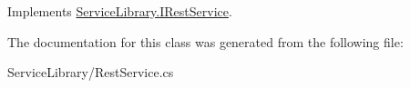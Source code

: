 Implements \hyperlink{interface_service_library_1_1_i_rest_service_a8d80e4dac07cf691bc685c1944192f22}{Service\-Library.\-I\-Rest\-Service}.



The documentation for this class was generated from the following file\-:\begin{DoxyCompactItemize}
\item 
Service\-Library/Rest\-Service.\-cs\end{DoxyCompactItemize}
